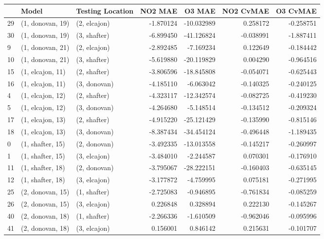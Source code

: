 \begin{tabular}{lllrrrr}
\toprule
{} &             Model & Testing Location &    NO2 MAE &     O3 MAE &  NO2 CvMAE &  O3 CvMAE \\
\midrule
29 &  (1, donovan, 19) &     (2, elcajon) &  -1.870124 & -10.032989 &   0.258172 & -0.258751 \\
30 &  (1, donovan, 19) &     (3, shafter) &  -6.899450 & -41.126824 &  -0.038991 & -1.887411 \\
9  &  (1, donovan, 21) &     (2, elcajon) &  -2.892485 &  -7.169234 &   0.122649 & -0.184442 \\
10 &  (1, donovan, 21) &     (3, shafter) &  -5.619880 & -20.119829 &   0.004290 & -0.964516 \\
15 &  (1, elcajon, 11) &     (2, shafter) &  -3.806596 & -18.845808 &  -0.054071 & -0.625443 \\
16 &  (1, elcajon, 11) &     (3, donovan) &  -4.185110 &  -6.063042 &  -0.140325 & -0.240125 \\
4  &  (1, elcajon, 12) &     (2, shafter) &  -4.323117 & -12.342574 &  -0.082725 & -0.419230 \\
5  &  (1, elcajon, 12) &     (3, donovan) &  -4.264680 &  -5.148514 &  -0.134512 & -0.209324 \\
17 &  (1, elcajon, 13) &     (2, shafter) &  -4.915220 & -25.121429 &  -0.135990 & -0.815146 \\
18 &  (1, elcajon, 13) &     (3, donovan) &  -8.387434 & -34.454124 &  -0.496448 & -1.189435 \\
0  &  (1, shafter, 15) &     (2, donovan) &  -3.492335 & -13.013558 &  -0.145217 & -0.260997 \\
1  &  (1, shafter, 15) &     (3, elcajon) &  -3.484010 &  -2.244587 &   0.070301 & -0.176910 \\
11 &  (1, shafter, 18) &     (2, donovan) &  -3.795067 & -28.222151 &  -0.160403 & -0.635145 \\
12 &  (1, shafter, 18) &     (3, elcajon) &  -3.177872 &  -4.759995 &   0.075181 & -0.271995 \\
25 &  (2, donovan, 15) &     (1, shafter) &  -2.725083 &  -0.946895 &  -0.761834 & -0.085259 \\
26 &  (2, donovan, 15) &     (3, elcajon) &   0.226848 &   0.328894 &   0.222130 & -0.145267 \\
40 &  (2, donovan, 18) &     (1, shafter) &  -2.266336 &  -1.610509 &  -0.962046 & -0.095996 \\
41 &  (2, donovan, 18) &     (3, elcajon) &   0.156001 &   0.846142 &   0.215631 & -0.101707 \\

\end{tabular}
